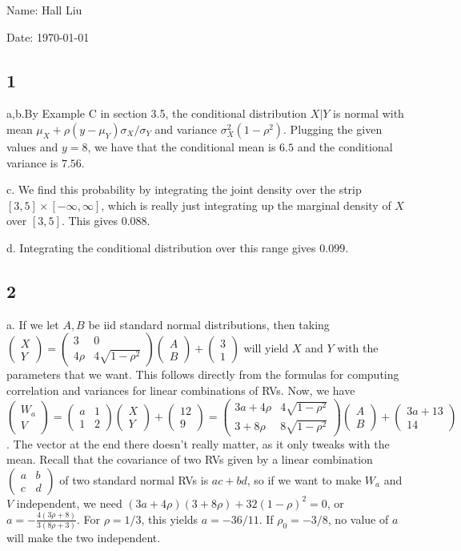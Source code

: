 \documentclass{article}
\newcommand{\openm}{\begin{pmatrix}}
\newcommand{\closem}{\end{pmatrix}}
\begin{document}
Name: Hall Liu

Date: \today 
\vspace{1.5cm}

\subsection*{1}
a,b.By Example C in section 3.5, the conditional distribution $X|Y$ is normal with mean $\mu_X+\rho(y-\mu_Y)\sigma_X/\sigma_Y$ and variance $\sigma_X^2(1-\rho^2)$. Plugging the given values and $y=8$, we have that the conditional mean is $6.5$ and the conditional variance is $7.56$.

c. We find this probability by integrating the joint density over the strip $[3,5]\times[-\infty,\infty]$, which is really just integrating up the marginal density of $X$ over $[3,5]$. This gives $0.088$.

d. Integrating the conditional distribution over this range gives $0.099$.
\subsection*{2}
a. If we let $A,B$ be iid standard normal distributions, then taking $\openm X\\Y\closem=\openm3&0\\4\rho &4\sqrt{1-\rho^2}\closem\openm A\\B\closem+\openm3\\1\closem$ will yield $X$ and $Y$ with the parameters that we want. This follows directly from the formulas for computing correlation and variances for linear combinations of RVs. Now, we have $\openm W_a\\V\closem=\openm a&1\\1&2\closem\openm X\\Y\closem+\openm12\\9\closem=\openm3a+4\rho&4\sqrt{1-\rho^2}\\3+8\rho&8\sqrt{1-\rho^2}\closem\openm A\\B\closem+\openm3a+13\\14\closem$. The vector at the end there doesn't really matter, as it only tweaks with the mean. Recall that the covariance of two RVs given by a linear combination $\openm a&b\\c&d\closem$ of two standard normal RVs is $ac+bd$, so if we want to make $W_a$ and $V$ independent, we need $(3a+4\rho)(3+8\rho)+32(1-\rho)^2=0$, or $a=-\frac{4(3\rho+8)}{3(8\rho+3)}$. For $\rho=1/3$, this yields $a=-36/11$. If $\rho_0=-3/8$, no value of $a$ will make the two independent.
\end{document}
